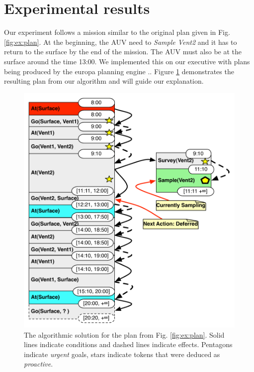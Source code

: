 
\section{Experimental results}
\label{sec:exp}


Our experiment follows a mission similar to the original plan given in
Fig. \ref{fig:ex:plan}. At the beginning, the AUV need to {\em Sample Vent2}
and it has to return to the surface by the end of the mission. The AUV must
also be at the surface around the time 13:00. We
implemented this on our executive with plans being produced by the
europa planning engine \cite{frank2003}.. Figure \ref{fig:ex:mixed1}
demonstrates the resulting plan from our algorithm and will guide our
explanation.

\begin{figure}
  \centering
  \includegraphics[width=0.8\columnwidth]{figs/example_MixedInitial}
  \caption{\small The algorithmic solution for the plan from
    Fig. \ref{fig:ex:plan}. Solid lines indicate conditions and
    dashed lines indicate effects. Pentagons indicate {\em urgent}
    goals, stars indicate tokens that were deduced as {\em proactive}.}
  \label{fig:ex:mixed1}
\end{figure}

